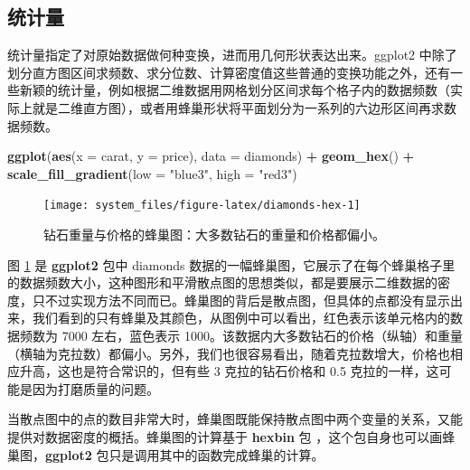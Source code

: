 \documentclass[
  b5paper,
  UTF8,twoside]{book}
\newenvironment{Shaded}{\begin{snugshade}}{\end{snugshade}}
\newcommand{\AttributeTok}[1]{\textcolor[rgb]{0.13,0.29,0.53}{#1}}
\newcommand{\FunctionTok}[1]{\textcolor[rgb]{0.13,0.29,0.53}{\textbf{#1}}}
\newcommand{\NormalTok}[1]{#1}
\newcommand{\SpecialCharTok}[1]{\textcolor[rgb]{0.81,0.36,0.00}{\textbf{#1}}}
\newcommand{\StringTok}[1]{\textcolor[rgb]{0.31,0.60,0.02}{#1}}
\begin{document}
\subsection{统计量}\label{ux7edfux8ba1ux91cf}

统计量指定了对原始数据做何种变换，进而用几何形状表达出来。ggplot2 中除了划分直方图区间求频数、求分位数、计算密度值这些普通的变换功能之外，还有一些新颖的统计量，例如根据二维数据用网格划分区间求每个格子内的数据频数（实际上就是二维直方图），或者用蜂巢形状将平面划分为一系列的六边形区间再求数据频数。

\begin{Shaded}
\begin{Highlighting}[]
\FunctionTok{ggplot}\NormalTok{(}\FunctionTok{aes}\NormalTok{(}\AttributeTok{x =}\NormalTok{ carat, }\AttributeTok{y =}\NormalTok{ price), }\AttributeTok{data =}\NormalTok{ diamonds) }\SpecialCharTok{+}
  \FunctionTok{geom\_hex}\NormalTok{() }\SpecialCharTok{+}
  \FunctionTok{scale\_fill\_gradient}\NormalTok{(}\AttributeTok{low =} \StringTok{"blue3"}\NormalTok{, }\AttributeTok{high =} \StringTok{"red3"}\NormalTok{)}
\end{Highlighting}
\end{Shaded}

\begin{figure}

{\centering \texttt{[image: system\_files/figure-latex/diamonds-hex-1]} 

}

\caption[钻石重量与价格的蜂巢图]{钻石重量与价格的蜂巢图：大多数钻石的重量和价格都偏小。}\label{fig:diamonds-hex}
\end{figure}





图 \ref{fig:diamonds-hex} 是 \textbf{ggplot2} 包中 diamonds 数据的一幅蜂巢图，它展示了在每个蜂巢格子里的数据频数大小，这种图形和平滑散点图的思想类似，都是要展示二维数据的密度，只不过实现方法不同而已。蜂巢图的背后是散点图，但具体的点都没有显示出来，我们看到的只有蜂巢及其颜色，从图例中可以看出，红色表示该单元格内的数据频数为 7000 左右，蓝色表示 1000。该数据内大多数钻石的价格（纵轴）和重量（横轴为克拉数）都偏小。另外，我们也很容易看出，随着克拉数增大，价格也相应升高，这也是符合常识的，但有些 3 克拉的钻石价格和 0.5 克拉的一样，这可能是因为打磨质量的问题。

当散点图中的点的数目非常大时，蜂巢图既能保持散点图中两个变量的关系，又能提供对数据密度的概括。蜂巢图的计算基于 \textbf{hexbin} 包 \citep{hexbin}，这个包自身也可以画蜂巢图，\textbf{ggplot2} 包只是调用其中的函数完成蜂巢的计算。
\end{document}
